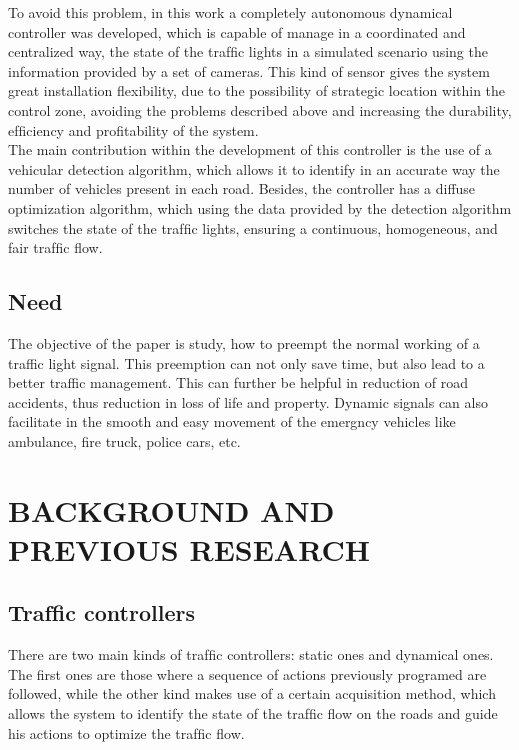 \documentclass{SureshLimkar}
\begin{document}
\hspace {0.3 in}To avoid this problem, in this work a completely autonomous dynamical controller was developed, which is capable of manage in a coordinated and centralized way, the
state of the trafﬁc lights in a simulated scenario using the
information provided by a set of cameras. This kind of
sensor gives the system great installation ﬂexibility, due to
the possibility of strategic location within the control zone,
avoiding the problems described above and increasing the
durability, efﬁciency and proﬁtability of the system.\\

\hspace{0.3 in}The main contribution within the development of this controller is the use of a vehicular detection algorithm, which
allows it to identify in an accurate way the number of vehicles
present in each road. Besides, the controller has a diffuse
optimization algorithm, which using the data provided by the
detection algorithm switches the state of the trafﬁc lights,
ensuring a continuous, homogeneous, and fair trafﬁc ﬂow.

\section{Need}

\hspace {0.5 in}The objective of the paper is study, how to preempt the normal working of a traffic light signal. This preemption can not only save time, but also lead to a better traffic management. This can further be helpful in reduction of road accidents, thus reduction in loss of life and property. Dynamic signals can also facilitate in the smooth and easy movement of the emergncy vehicles like ambulance, fire truck, police cars, etc.

\chapter{BACKGROUND AND PREVIOUS RESEARCH}
\section{Trafﬁc controllers}
\hspace {0.5 in}There are two main kinds of trafﬁc controllers: static ones
and dynamical ones. The ﬁrst ones are those where a sequence
of actions previously programed are followed, while the other
kind makes use of a certain acquisition method, which allows
the system to identify the state of the trafﬁc ﬂow on the roads
and guide his actions to optimize the trafﬁc ﬂow. 
\end{document}
